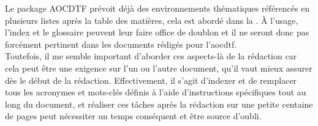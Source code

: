 \documentclass[a4paper, 11pt, twoside, fleqn]{memoir}
\begin{document}
Le package AOCDTF prévoit déjà des environnements thématiques référencés en plusieurs listes après la table des matières, cela est abordé dans la . À l'usage, l'index et le glossaire peuvent leur faire office de doublon et il ne seront donc pas forcément pertinent dans les documents rédigés pour l'\gls{aocdtf}.\\
Toutefois, il me semble important d'aborder ces aspects-là de la rédaction car cela peut être une exigence sur l'un ou l'autre document, qu'il vaut mieux assurer dès le début de la rédaction. Effectivement, il s'agit d'indexer et de remplacer tous les acronymes et mots-clés définis à l'aide d'instructions spécifiques tout au long du document, et réaliser ces tâches après la rédaction sur une petite centaine de pages peut nécessiter un temps conséquent et être source d'oubli.
\end{document}
